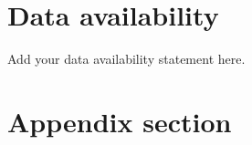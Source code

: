 \documentclass[reprint,preprintnumbers,nofootinbib,amsmath,amssymb,aps,prd,]{revtex4-2}
\begin{document}
%


\section*{Data availability}

Add your data availability statement here.

\begin{acknowledgments}
\end{acknowledgments}

\appendix
\section{Appendix section}


\end{document}
